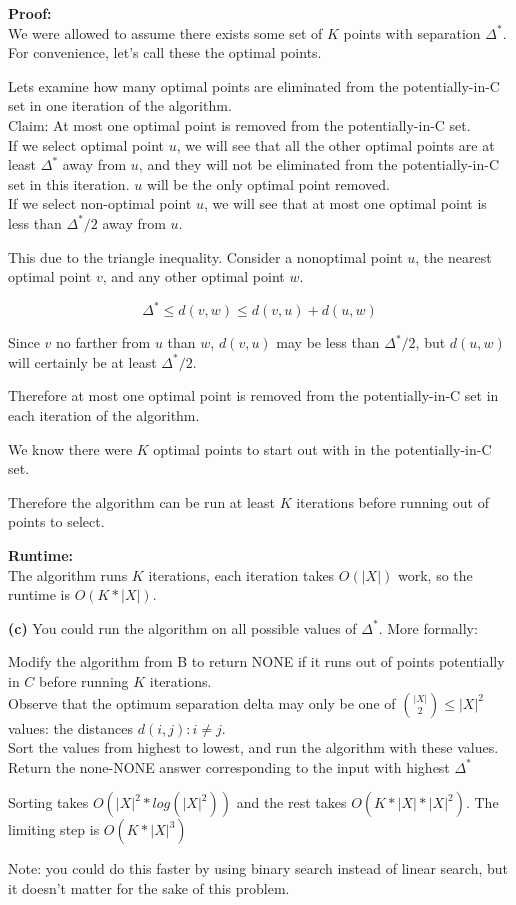 \documentclass[11pt]{article}
\renewcommand{\part}[1] {\vspace{.10in} {\bf (#1)}}
\begin{document}
\textbf{Proof:}\\
We were allowed to assume there exists some set of $K$ points with separation $\Delta^{*}$.\\
For convenience, let's call these the optimal points.

Lets examine how many optimal points are eliminated from the potentially-in-C set in one iteration of the algorithm.\\
Claim: At most one optimal point is removed from the potentially-in-C set.\\
If we select optimal point $u$, we will see that all the other optimal points are at least $\Delta^{*}$ away from $u$, and they will not be eliminated from the potentially-in-C set in this iteration. $u$ will be the only optimal point removed.\\
If we select non-optimal point $u$, we will see that at most one optimal point is less than $\Delta^{*} / 2$ away from $u$.

This due to the triangle inequality. Consider a nonoptimal point $u$, the nearest optimal point $v$, and any other optimal point $w$.

$$\Delta^{*} \leq d(v,w) \leq d(v,u) + d(u,w)$$

Since $v$ no farther from  $u$ than $w$, $d(v,u)$ may be less than $\Delta^{*} / 2$, but $d(u,w)$ will certainly be at least $\Delta^{*} / 2$.

Therefore at most one optimal point is removed from the potentially-in-C set in each iteration of the algorithm.

We know there were $K$ optimal points to start out with in the potentially-in-C set.

Therefore the algorithm can be run at least $K$ iterations before running out of points to select.

\textbf{Runtime:}\\
The algorithm runs $K$ iterations, each iteration takes $O(|X|)$ work, so the runtime is $O(K*|X|)$.

\part{c}
You could run the algorithm on all possible values of $\Delta^{*}$. More formally:

Modify the algorithm from B to return NONE if it runs out of points potentially in $C$ before running $K$ iterations.\\
Observe that the optimum separation delta may only be one of $\binom{|X|}{2} \leq |X|^2$ values: the distances $d(i,j) : i \neq j$.\\
Sort the values from highest to lowest, and run the algorithm with these values.\\
Return the none-NONE answer corresponding to the input with highest $\Delta^{*}$

Sorting takes $O(|X|^{2} * log(|X|^2))$ and the rest takes $O(K*|X|*|X|^2)$. The limiting step is $O(K*|X|^3)$

Note: you could do this faster by using binary search instead of linear search, but it doesn't matter for the sake of this problem.
\end{document}
